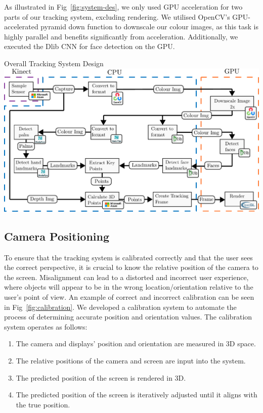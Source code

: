 As illustrated in Fig~\ref{fig:system-des}, we only used GPU acceleration for two parts of our tracking system, excluding rendering. We utilised OpenCV's GPU-accelerated pyramid down function to downscale our colour images, as this task is highly parallel and benefits significantly from acceleration. Additionally, we executed the Dlib CNN for face detection on the GPU.

\begin{figureBox}[label={fig:system-des}, width=0.95\linewidth]{Overall Tracking System Design}
    \includegraphics[width=1.0\linewidth]{./implementation/figures/tracking-system.pdf}
\end{figureBox}


\subsection{Camera Positioning}

To ensure that the tracking system is calibrated correctly and that the user sees the correct perspective, it is crucial to know the relative position of the camera to the screen. Misalignment can lead to a distorted and incorrect user experience, where objects will appear to be in the wrong location/orientation relative to the user's point of view. An example of correct and incorrect calibration can be seen in Fig~\ref{fig:calibration}. We developed a calibration system to automate the process of determining accurate position and orientation values. The calibration system operates as follows:
\begin{enumerate}[itemsep=-0.3em]
    \item The camera and displays' position and orientation are measured in 3D space.
    \item The relative positions of the camera and screen are input into the system.
    \item The predicted position of the screen is rendered in 3D.
    \item The predicted position of the screen is iteratively adjusted until it aligns with the true position.
\end{enumerate}


